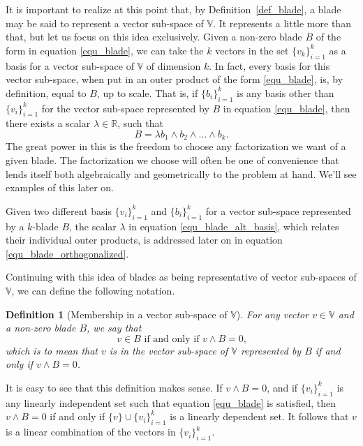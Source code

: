 \documentclass[12pt]{article}
\numberwithin{equation}{section}
\newcommand{\V}{\mathbb{V}}
\newcommand{\R}{\mathbb{R}}
\newtheorem{definition}{Definition}[section]
\begin{document}
It is important to realize at this point that, by Definition~\ref{def_blade}, a blade
may be said to represent a vector sub-space of $\V$.  It represents a little more
than that, but let us focus on this idea exclusively.  Given a non-zero blade $B$ of the
form in equation \eqref{equ_blade}, we can take the $k$ vectors in the
set $\{v_k\}_{i=1}^k$ as a basis for a vector sub-space of $\V$ of
dimension $k$.  In fact, every basis for this vector sub-space, when put
in an outer product of the form \eqref{equ_blade}, is, by definition,
equal to $B$, up to scale.  That is, if $\{b_i\}_{i=1}^k$ is any basis
other than $\{v_i\}_{i=1}^k$
for the vector sub-space represented by $B$ in equation \eqref{equ_blade},
then there exists a scalar $\lambda\in\R$, such that
\begin{equation}\label{equ_blade_alt_basis}
B = \lambda b_1\wedge b_2\wedge\dots\wedge b_k.
\end{equation}
The great power in this is the freedom to choose any factorization we want
of a given blade.  The factorization we choose will often be one of convenience
that lends itself both algebraically and geometrically to the problem at hand.
We'll see examples of this later on.

Given two different basis $\{v_i\}_{i=1}^k$ and $\{b_i\}_{i=1}^k$ for a
vector sub-space represented by a $k$-blade $B$, the scalar $\lambda$ in equation \eqref{equ_blade_alt_basis},
which relates their individual outer products, is addressed later on in equation \eqref{equ_blade_orthogonalized}.

Continuing with this idea of blades as being representative of vector sub-spaces
of $\V$, we can define the following notation.
\begin{definition}[Membership in a vector sub-space of $\V$]
For any vector $v\in\V$ and a non-zero blade $B$, we say that
\begin{equation}
\mbox{$v\in B$ if and only if $v\wedge B=0$,}
\end{equation}
which is to mean that $v$ is in the vector sub-space of $\V$ represented by $B$
if and only if $v\wedge B=0$.
\end{definition}
It is easy to see that this definition makes sense.  If $v\wedge B=0$, and if $\{v_i\}_{i=1}^k$
is any linearly independent set such that equation \eqref{equ_blade} is
satisfied, then $v\wedge B=0$ if and only if $\{v\}\cup\{v_i\}_{i=1}^k$
is a linearly dependent set.  It follows that $v$ is a linear combination of
the vectors in $\{v_i\}_{i=1}^k$.
\end{document}
